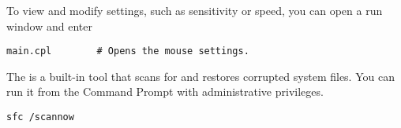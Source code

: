 To view and modify  settings, such as sensitivity or speed, you can open a run window and enter
\begin{lstlisting}[style=terminalstyle]
main.cpl		# Opens the mouse settings.
\end{lstlisting}

The  is a built-in tool that scans for and restores corrupted system files. You can run it from the Command Prompt with administrative privileges.
\begin{lstlisting}[style=terminalstyle]
sfc /scannow
\end{lstlisting}